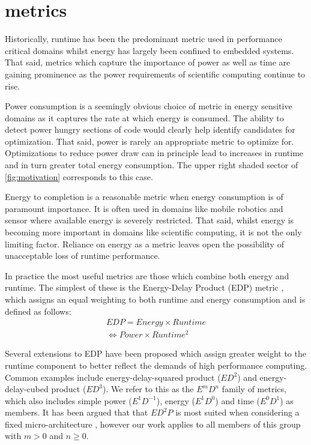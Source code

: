 \section{metrics}
\label{sec:metrics}
Historically, runtime has been the predominant metric used in performance critical domains whilst energy has largely been confined to embedded systems.
That said, metrics which capture the importance of power as well as time are gaining prominence as the power requirements of scientific computing continue to rise.

%
%
Power consumption is a seemingly obvious choice of metric in energy sensitive domains as it captures the rate at which energy is consumed.
The ability to detect power hungry sections of code would clearly help identify candidates for optimization.
That said, power is rarely an appropriate metric to optimize for.
Optimizations to reduce power draw can in principle lead to increases in runtime and in turn greater total energy consumption.
The upper right shaded sector of \autoref{fig:motivation} corresponds to this case.

Energy to completion is a reasonable metric when energy consumption is of paramount importance.
It is often used in domains like mobile robotics and sensor where available energy is severely restricted.
That said, whilst energy is becoming more important in domains like scientific computing, it is not the only limiting factor. 
Reliance on energy as a metric leaves open the possibility of unacceptable loss of runtime performance.

In practice the most useful metrics are those which combine both energy and runtime.
The simplest of these is the Energy-Delay Product (EDP) metric \cite{gonzales:1995aa}, which assigns an equal weighting to both runtime and energy consumption and is defined as follows:
\begin{align}
  EDP = Energy \times Runtime \nonumber \\
      \Leftrightarrow Power \times Runtime^{2} 
  \label{eq:edp}
\end{align}

Several extensions to EDP have been proposed which assign greater weight to the runtime component to better reflect the demands of high performance computing.
Common examples include energy-delay-squared product ($ED^{2}$) and energy-delay-cubed product ($ED^{3}$).
We refer to this as the $E^mD^n$ family of metrics, which also includes simple power ($E^1D^{-1}$), energy ($E^1D^0$) and time ($E^0D^1$) as members.
It has been argued that that $ED^{2}P$ is most suited when considering a fixed micro-architecture \cite{brooks:2000aa}, however our work applies to all members of this group with $m > 0$ and $n \geq 0$.
